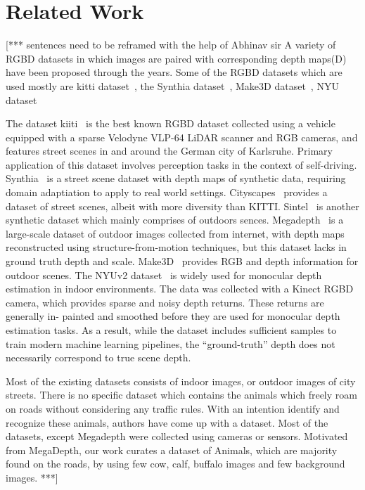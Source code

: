 \documentclass{article}
\begin{document}
\section {Related Work}
[*** sentences need to be reframed with the help of Abhinav sir
A variety of RGBD datasets in which images are paired with corresponding depth maps(D) have been proposed through the years.
Some of the RGBD datasets which are used mostly are kitti dataset~\cite{geiger2013vision}, the Synthia dataset~\cite{ros2016synthia}, Make3D dataset~\cite{saxena2008make3d}, NYU dataset~\cite{silberman2012indoor}

The dataset kiiti~\cite{geiger2013vision} is the best known RGBD dataset collected using a vehicle equipped with a sparse Velodyne VLP-64 LiDAR scanner and RGB cameras, and features street scenes in and around the German city of Karlsruhe. Primary application of this dataset involves perception tasks in the context of self-driving. Synthia~\cite{ros2016synthia} is a street scene dataset with depth maps of synthetic data, requiring domain adaptiation to apply to real world settings. Cityscapes~\cite{cordts2016cityscapes} provides a dataset of street scenes, albeit with more diversity than KITTI. Sintel~\cite{mayer2016large} is another synthetic dataset which mainly comprises of outdoors sences. Megadepth~\cite{li2018megadepth} is a large-scale dataset of outdoor images collected from internet, with depth maps reconstructed using structure-from-motion techniques, but this dataset lacks in ground truth depth and scale. Make3D~\cite{saxena2008make3d} provides RGB and depth information for outdoor scenes. The NYUv2 dataset~\cite{silberman2012indoor} is widely used for monocular depth estimation in indoor environments. The data was collected with a Kinect RGBD camera, which provides sparse and noisy depth returns. These returns are generally in- painted and smoothed before they are used for monocular depth estimation tasks. As a result, while the dataset includes sufficient samples to train modern machine learning pipelines, the “ground-truth” depth does not necessarily correspond to true scene depth.

Most of the existing datasets consists of indoor images, or outdoor images of city streets. There is no specific dataset which contains the animals which freely roam on roads without considering any traffic rules. With an intention identify and recognize these animals, authors have come up with a dataset. Most of the datasets, except Megadepth were collected using cameras or sensors. Motivated from MegaDepth, our work curates a dataset of Animals, which are majority found on the roads, by using few cow, calf, buffalo images and few background images.
***]
\end{document}
